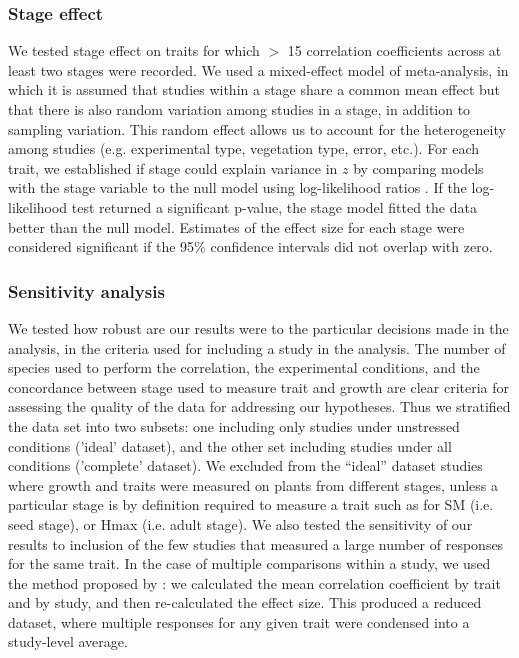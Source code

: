 \documentclass[a4paper]{article}\usepackage[]{graphicx}\usepackage[]{color}
\begin{document}
\subsubsection*{Stage effect}

We tested stage effect on traits for which $>$ 15 correlation coefficients across at least two stages were recorded. We used a mixed-effect model of meta-analysis, in which it is assumed that studies within a stage share a common mean effect but that there is also random variation among studies in a stage, in addition to sampling variation. This random effect allows us to account for the heterogeneity among studies (e.g. experimental type, vegetation type, error, etc.). For each trait, we established if stage could explain variance in $z$ by comparing models with the stage variable to the null model using log-likelihood ratios \citep{Zuur:2009cfa}. If the log-likelihood test returned a significant p-value, the stage model fitted the data better than the null model. Estimates of the effect size for each stage were considered significant if the 95\% confidence intervals did not overlap with zero.

\subsubsection*{Sensitivity analysis}

We tested how robust are our results were to the particular decisions made in the analysis, in the criteria used for including a study in the analysis. The number of species used to perform the correlation, the experimental conditions, and the concordance between stage used to measure trait and growth are clear criteria for assessing the quality of the data for addressing our hypotheses. Thus we stratified the data set into two subsets: one including only studies under unstressed conditions ('ideal' dataset), and the other set including studies under all conditions ('complete' dataset). We excluded from the ``ideal'' dataset studies where growth and traits were measured on plants from different stages, unless a particular stage is by definition required to measure a trait such as for SM (i.e. seed stage), or Hmax (i.e. adult stage).
We also tested the sensitivity of our results to inclusion of the few studies that measured a large number of responses for the same trait. In the case of multiple comparisons within a study, we used the method proposed by \citet{Borenstein:2009um}: we calculated the mean correlation coefficient by trait and by study, and then re-calculated the effect size. This produced a reduced dataset, where multiple responses for any given trait were condensed into a study-level average.
\end{document}
